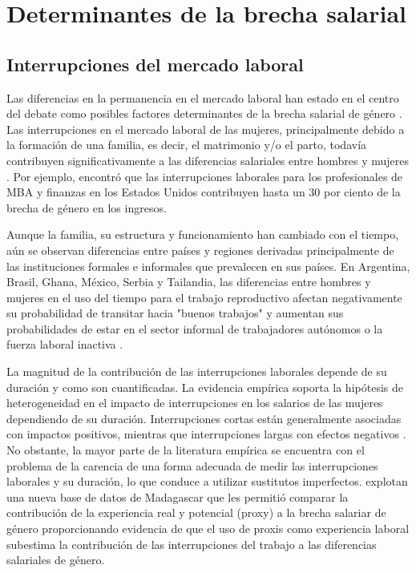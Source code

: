 \section{Determinantes de la brecha salarial}
\subsection{Interrupciones del mercado laboral}
Las diferencias en la permanencia en el mercado laboral han estado en el centro del debate como posibles factores determinantes de la brecha salarial de género \citep{Mincer1974}. Las interrupciones en el mercado laboral de las mujeres, principalmente debido a la formación de una familia, es decir, el matrimonio y/o el parto, todavía contribuyen significativamente a las diferencias salariales entre hombres y mujeres \citep{WorldBank2012}. Por ejemplo, \citet{Goldin2014} encontró que las interrupciones laborales para los profesionales de MBA y finanzas en los Estados Unidos contribuyen hasta un 30 por ciento de la brecha de género en los ingresos.

Aunque la familia, su estructura y funcionamiento han cambiado con el tiempo, aún se observan diferencias entre países y regiones derivadas principalmente de las instituciones formales e informales que prevalecen en sus países. En Argentina, Brasil, Ghana, México, Serbia y Tailandia, las diferencias entre hombres y mujeres en el uso del tiempo para el trabajo reproductivo afectan negativamente su probabilidad de transitar hacia "buenos trabajos" y aumentan sus probabilidades de estar en el sector informal de trabajadores autónomos o la fuerza laboral inactiva \citep{Bosch2010}.

La magnitud de la contribución de las interrupciones laborales depende de su duración y como son cuantificadas. La evidencia empírica soporta la hipótesis de heterogeneidad en el impacto de interrupciones en los salarios de las mujeres dependiendo de su duración. Interrupciones cortas están generalmente asociadas con impactos positivos, mientras que interrupciones largas con efectos negativos \citep{Blau2000,Ruhm1998,Waldfogel1998}. No obstante, la mayor parte de la literatura empírica se encuentra con el problema de la carencia de una forma adecuada de medir las interrupciones laborales y su duración, lo que conduce a utilizar sustitutos imperfectos. \citet{Nordman2016} explotan una nueva base de datos de Madagascar que les permitió comparar la contribución de la experiencia real y potencial (proxy) a la brecha salariar de género proporcionando evidencia de que el uso de proxis como experiencia laboral subestima la contribución de las interrupciones del trabajo a las diferencias salariales de género.

